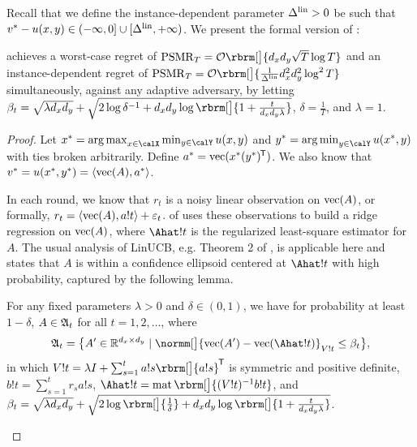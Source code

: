 Recall that we define the instance-dependent parameter $\Delta^{\mathrm{lin}}>0$ be such that $v^* - u(x,y)\in (-\infty,0]\cup [\Delta^{\mathrm{lin}}, +\infty)$.
We present the formal version of :

\begin{theorem}\label{thm:purelinucb}
    \PureLinUCB{} achieves a worst-case regret of $\psmr_T=\order\rbrm[\big]{d_x d_y \sqrt{T} \log T}$ and an instance-dependent regret of $\psmr_T=\order\rbrm[\big]{\frac{1}{\DeltaLin}d_x^2 d_y^2 \log^2 T}$ simultaneously, against any adaptive adversary, by letting $\beta_t=\sqrt{\lambda d_x d_y}+\sqrt{2\log \delta^{-1}+d_x d_y \log \rbrm[\big]{1+\frac{t}{d_x d_y\lambda}}}$, $\delta=\frac{1}{T}$, and $\lambda=1$.
\end{theorem}


\begin{proof}
Let $x^*=\argmax_{x\in \calX} \min_{y\in \calY} u(x,y)$ and $y^* = \argmin_{y\in \calY} u(x^*,y)$ with ties broken arbitrarily. Define $a^*=\operatorname{vec}(x^* (y^*)^{\mkern-1.5mu\mathsf{T}})$. We also know that $\vStar=u(x^*,y^*)=\inner{\vect(A)}{a^*}$.

In each round, we know that $r_t$ is a noisy linear observation on $\operatorname{vec}(A)$, or formally, $r_t=\inner{\vect(A)}{a!t}+\eps_t$.  of  uses these observations to build a ridge regression on $\operatorname{vec}(A)$, where $\Ahat!t$ is the regularized least-square estimator for $A$. The usual analysis of LinUCB, e.g. Theorem 2 of \cite{abbasi-yadkori2011improved}, is applicable here and states that $A$ is within a confidence ellipsoid centered at $\Ahat!t$ with high probability, captured by the following lemma.

\begin{lemma}\label{lem:conf-ellipsoid}
    For any fixed parameters $\lambda>0$ and $\delta\in (0, 1)$, we have for probability at least $1-\delta$, $A\in \mathfrak{A}_t$ for all $t=1,2,\dots$, where
    \begin{equation}
        \confset_t=\cbr{A'\in \dR^{d_x\times d_y}\mid \normm[\big]{\vect(A')-\vect(\Ahat!t)}_{V!t}\leq \beta_t},
    \end{equation}
    in which $V!t=\lambda I + \sum_{s=1}^t a!s \rbrm[\big]{a!s}^\trans$ is symmetric and positive definite, $b!t=\sum_{s=1}^t r_s a!s$, $\Ahat!t=\mat\rbrm[\big]{(V!t)^{-1}b!t}$, and $\beta_t=\sqrt{\lambda d_x d_y} +\sqrt{2\log\rbrm[\big]{\frac{1}{\delta}}+d_x d_y \log \rbrm[\big]{1+\frac{t}{d_x d_y\lambda}}}$.
\end{lemma}


\end{proof}

